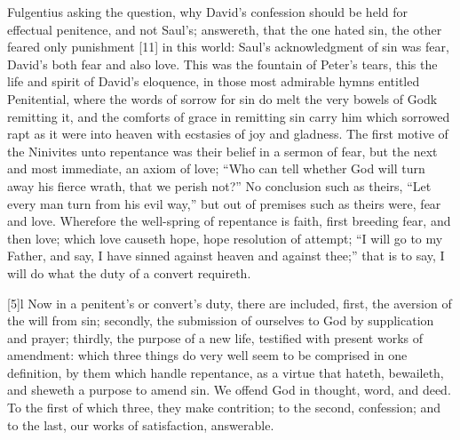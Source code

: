 Fulgentius asking the question, why David’s confession should be held for effectual penitence, and not Saul’s; answereth, that the one hated sin, the other feared only punishment [11] in this world: Saul’s acknowledgment of sin was fear, David’s both fear and also love. This was the fountain of Peter’s tears, this the life and spirit of David’s eloquence, in those most admirable hymns entitled Penitential, where the words of sorrow for sin do melt the very bowels of Godk remitting it, and the comforts of grace in remitting sin carry him which sorrowed rapt as it were into heaven with ecstasies of joy and gladness. The first motive of the Ninivites unto repentance was their belief in a sermon of fear, but the next and most immediate, an axiom of love; “Who can tell whether God will turn away his fierce wrath, that we perish not?” No conclusion such as theirs, “Let every man turn from his evil way,” but out of premises such as theirs were, fear and love. Wherefore the well-spring of repentance is faith, first breeding fear, and then love; which love causeth hope, hope resolution of attempt; “I will go to my Father, and say, I have sinned against heaven and against thee;” that is to say, I will do what the duty of a convert requireth.

[5]l Now in a penitent’s or convert’s duty, there are included, first, the aversion of the will from sin; secondly, the submission of ourselves to God by supplication and prayer; thirdly, the purpose of a new life, testified with present works of amendment: which three things do very well seem to be comprised in one definition, by them which handle repentance, as a virtue that hateth, bewaileth, and sheweth a purpose to amend sin. We offend God in thought, word, and deed. To the first of which three, they make contrition; to the second, confession; and to the last, our works of satisfaction, answerable.

